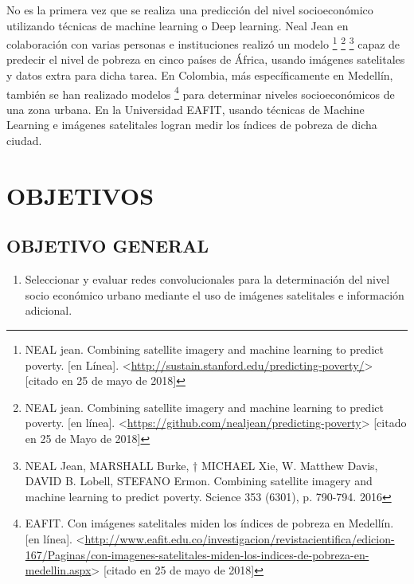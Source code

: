 No es la primera vez que se realiza una predicción del nivel socioeconómico utilizando técnicas de machine learning o Deep learning. Neal Jean en colaboración con varias personas e instituciones realizó un modelo \footnote[4]{NEAL jean. Combining satellite imagery and machine learning to predict poverty. [en Línea]. <\url{http://sustain.stanford.edu/predicting-poverty/}> [citado en 25 de mayo de 2018]} \footnote[5]{NEAL jean. Combining satellite imagery and machine learning to predict poverty. [en línea]. <\url{https://github.com/nealjean/predicting-poverty}> [citado en 25 de Mayo de 2018]} \footnote[6]{NEAL Jean, MARSHALL Burke, † MICHAEL Xie, W. Matthew Davis, DAVID B. Lobell, STEFANO Ermon. Combining satellite imagery and machine learning to predict poverty. Science 353 (6301), p. 790-794. 2016} capaz de predecir el nivel de pobreza en cinco países de África, usando imágenes satelitales y datos extra para dicha tarea. En Colombia, más específicamente en Medellín, también se han realizado modelos \footnote[7]{EAFIT. Con imágenes satelitales miden los índices de pobreza en Medellín. [en línea]. <\url{http://www.eafit.edu.co/investigacion/revistacientifica/edicion-167/Paginas/con-imagenes-satelitales-miden-los-indices-de-pobreza-en-medellin.aspx}> [citado en 25 de mayo de 2018]} para determinar niveles socioeconómicos de una zona urbana. En la Universidad EAFIT, usando técnicas de Machine Learning e imágenes satelitales logran medir los índices de pobreza de dicha ciudad.
    
    
    
    
\newpage\chapter{OBJETIVOS} 

	\section{OBJETIVO GENERAL}
		\begin{enumerate}
		\item Seleccionar y evaluar redes convolucionales para la determinación del nivel socio económico urbano mediante el uso de imágenes satelitales e información adicional.
		\end{enumerate}

